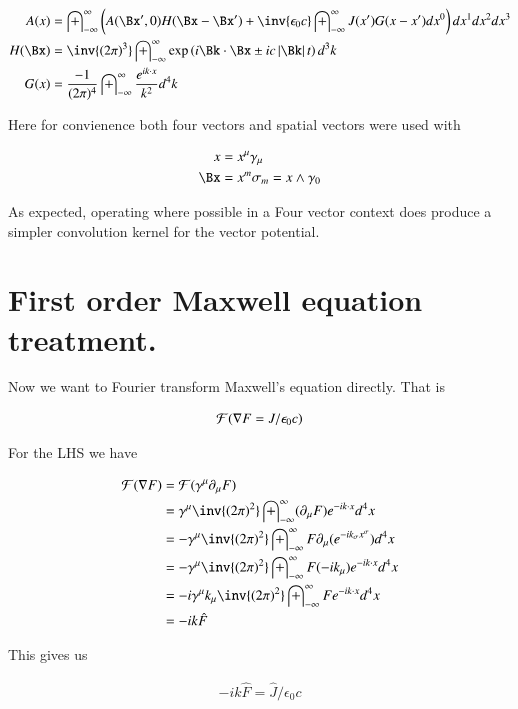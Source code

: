\documentclass{article}
\newcommand{\FF}[0]{\mathcal{F}}
\newcommand{\IIinf}[0]{ \int_{-\infty}^\infty }
\begin{document}
\begin{align}
A(x) &= \IIinf \left( A(\Bx', 0) H( \Bx - \Bx' ) + \inv{\epsilon_0 c} \IIinf {J}(x') G(x-x') dx^0 \right) dx^1 dx^2 dx^3 \\
H(\Bx) &= \inv{({2\pi})^3} \IIinf \exp\left( i \Bk \cdot \Bx  \pm i c \Abs{\Bk} t \right) d^3 k \\
G(x) &= \frac{-1}{ ({2\pi})^4} \IIinf \frac{e^{ i k \cdot x }}{ k^2 } d^4 k
\end{align}

Here for convienence both four vectors and spatial vectors were used with

\begin{align*}
x &= x^\mu \gamma_\mu \\
\Bx &= x^m \sigma_m = x \wedge \gamma_0
\end{align*}

As expected, operating where possible in a Four vector context does produce a simpler convolution kernel for the vector potential.

\section{ First order Maxwell equation treatment. }

Now we want to Fourier transform Maxwell's equation directly.  That is

\begin{align*}
\FF(\grad F = J/\epsilon_0 c)
\end{align*}

For the LHS we have

\begin{align*}
\FF(\grad F)
&= \FF(\gamma^\mu \partial_\mu F) \\
&= \gamma^\mu \inv{(2\pi)^2} \IIinf (\partial_\mu F) e^{ - i k \cdot x } d^4 x \\
&= -\gamma^\mu \inv{(2\pi)^2} \IIinf F \partial_\mu (e^{ - i k_\sigma x^\sigma }) d^4 x \\
&= -\gamma^\mu \inv{(2\pi)^2} \IIinf F (-i k_\mu ) e^{ - i k \cdot x } d^4 x \\
&= -i \gamma^\mu k_\mu \inv{(2\pi)^2} \IIinf F e^{ - i k \cdot x } d^4 x \\
&= -i k \hat{F}
\end{align*}

This gives us

\begin{align*}
-i k \hat{F} = \hat{J}/\epsilon_0 c
\end{align*}
\end{document}
